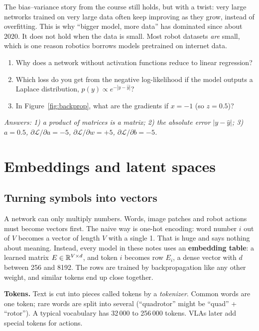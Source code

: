 \begin{watchbox}
The bias--variance story from the course still holds, but with a twist: very large networks trained on very large data often keep improving as they grow, instead of overfitting. This is why ``bigger model, more data'' has dominated since about 2020. It does not hold when the data is small. Most robot datasets \emph{are} small, which is one reason robotics borrows models pretrained on internet data.
\end{watchbox}

\begin{quizbox}
\begin{enumerate}[leftmargin=*]
\item Why does a network without activation functions reduce to linear regression?
\item Which loss do you get from the negative log-likelihood if the model outputs a Laplace distribution, $p(y)\propto e^{-|y-\hat y|}$?
\item In Figure~\ref{fig:backprop}, what are the gradients if $x=-1$ (so $z=0.5$)?
\end{enumerate}
\emph{Answers: 1) a product of matrices is a matrix; 2) the absolute error $|y-\hat y|$; 3) $a=0.5$, $\partial\mathcal L/\partial a=-5$, $\partial\mathcal L/\partial w=+5$, $\partial\mathcal L/\partial b=-5$.}
\end{quizbox}

\section{Embeddings and latent spaces}

\subsection{Turning symbols into vectors}
A network can only multiply numbers. Words, image patches and robot actions must become vectors first. The naive way is one-hot encoding: word number $i$ out of $V$ becomes a vector of length $V$ with a single 1. That is huge and says nothing about meaning. Instead, every model in these notes uses an \textbf{embedding table}: a learned matrix $E\in\mathbb{R}^{V\times d}$, and token $i$ becomes row $E_i$, a dense vector with $d$ between 256 and 8192. The rows are trained by backpropagation like any other weight, and similar tokens end up close together.

\textbf{Tokens.} Text is cut into pieces called tokens by a \emph{tokenizer}. Common words are one token; rare words are split into several (``quadrotor'' might be ``quad'' + ``rotor''). A typical vocabulary has 32\,000 to 256\,000 tokens. VLAs later add special tokens for actions.

